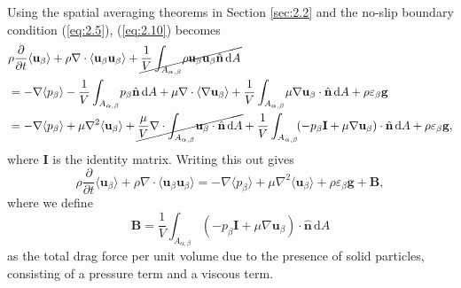 \documentclass[a4paper, 11pt]{report}
\begin{document}
Using the spatial averaging theorems in Section \ref{sec:2.2} and the no-slip boundary condition (\ref{eq:2.5}), (\ref{eq:2.10}) becomes
\begin{align*}
	&\rho\frac{\partial}{\partial t}\langle\mathbf{u}_{\beta}\rangle + \rho\nabla\cdot\langle\mathbf{u}_{\beta}\mathbf{u}_{\beta}\rangle + \cancel{\frac{1}{V} \int_{A_{\alpha,\beta}} \! \rho\mathbf{u}_{\beta}\mathbf{u}_{\beta} \hat{\mathbf{n}} \, \mathrm{d}A} \\ &= -\nabla\langle p_{\beta}\rangle - \frac{1}{V}\int_{A_{\alpha,\beta}} \! p_{\beta} \hat{\mathbf{n}} \, \mathrm{d}A + \mu\nabla\cdot\langle\nabla\mathbf{u}_{\beta}\rangle + \frac{1}{V}\int_{A_{\alpha,\beta}} \! \mu\nabla\mathbf{u}_{\beta}\cdot \hat{\mathbf{n}} \, \mathrm{d}A + \rho\varepsilon_\beta\mathbf{g}\\ &= -\nabla\langle p_{\beta}\rangle + \mu\nabla^2\langle\mathbf{u}_{\beta}\rangle + \cancel{\frac{\mu}{V}\nabla\cdot \int_{A_{\alpha,\beta}} \! \mathbf{u}_{\beta} \cdot \hat{\mathbf{n}} \, \mathrm{d}A} + \frac{1}{V}\int_{A_{\alpha,\beta}} \! (-p_{\beta}\mathbf{I} + \mu\nabla\mathbf{u}_{\beta})\cdot \hat{\mathbf{n}} \, \mathrm{d}A + \rho\varepsilon_\beta\mathbf{g},
\end{align*}
where $\mathbf{I}$ is the identity matrix. Writing this out gives
\begin{equation}
    \boxed{\rho\frac{\partial}{\partial t}\langle\mathbf{u}_{\beta}\rangle + \rho\nabla\cdot\langle\mathbf{u}_{\beta}\mathbf{u}_{\beta}\rangle = -\nabla\langle p_{\beta}\rangle + \mu\nabla^2\langle\mathbf{u}_{\beta}\rangle + \rho\varepsilon_\beta\mathbf{g} + \mathbf{B},} \label{eq:2.12}
\end{equation}
where we define
\begin{equation}
	\mathbf{B} = \frac{1}{V}\int_{A_{\alpha,\beta}} \! (-p_{\beta}\mathbf{I} + \mu\nabla\mathbf{u}_{\beta})\cdot \hat{\mathbf{n}} \, \mathrm{d}A \label{eq:2.13}
\end{equation}
as the total drag force per unit volume due to the presence of solid particles, consisting of a pressure term and a viscous term.
\end{document}
